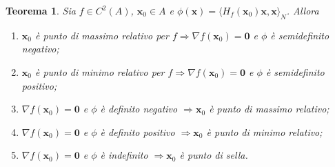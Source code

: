 \documentclass[a4paper,12pt]{report}
\theoremstyle{plain}
\newtheorem{thm}{Teorema}[section]
\theoremstyle{definition}
\theoremstyle{remark}
\numberwithin{equation}{section}
\begin{document}
\begin{thm} Sia $f \in C^2(A)$, $\mathbf{x}_0 \in A$ e $\phi(\mathbf{x})=\langle H_f(\mathbf{x}_0)\mathbf{x},\mathbf{x}\rangle_N$. Allora
\begin{enumerate}
 \item $\mathbf{x}_0$ è punto di massimo relativo per $f \Longrightarrow \nabla f(\mathbf{x}_0)=\mathbf{0}$ e $\phi$ è semidefinito 
negativo;
 \item $\mathbf{x}_0$ è punto di minimo relativo per $f \Longrightarrow \nabla f(\mathbf{x}_0)=\mathbf{0}$ e $\phi$ è semidefinito 
positivo;
 \item $\nabla f(\mathbf{x}_0)=\mathbf{0}$ e $\phi$ è definito negativo $\Longrightarrow \mathbf{x}_0$ è punto di massimo relativo;
 \item $\nabla f(\mathbf{x}_0)=\mathbf{0}$ e $\phi$ è definito positivo $\Longrightarrow \mathbf{x}_0$ è punto di minimo relativo;
 \item $\nabla f(\mathbf{x}_0)=\mathbf{0}$ e $\phi$ è indefinito $\Longrightarrow \mathbf{x}_0$ è punto di sella.
\end{enumerate}
\end{thm}
\end{document}
